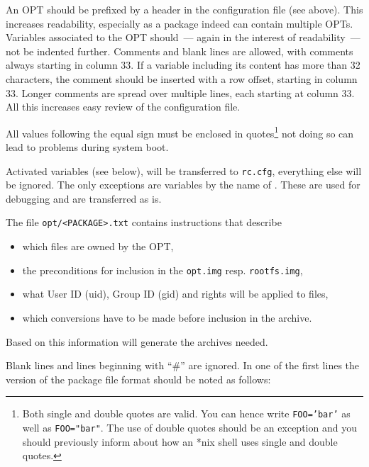 An OPT should be prefixed by a header in the configuration file (see
above). This increases readability, especially as a package indeed can
contain multiple OPTs. Variables associated to the OPT should~--- again
in the interest of readability~--- not be indented further. Comments and
blank lines are allowed, with comments always starting in column 33.
If a variable including its content has more than 32 characters, the
comment should be inserted with a row offset, starting in column 33.
Longer comments are spread over multiple lines, each starting at column
33. All this increases easy review of the configuration file.

All values following the equal sign must be enclosed in quotes\footnote{Both
single and double quotes are valid. You can hence write
\texttt{FOO='bar'} as well as \texttt{FOO="bar"}. The use of double quotes should be an
exception and you should previously inform about how an *nix shell uses single and
double quotes.}
not doing so can lead to problems during system boot.

    Activated variables (see below), will be transferred to \texttt{rc.cfg},
    everything else will be ignored. The only exceptions are variables by
    the name of . These are used for debugging and
    are transferred as is.


    The file \texttt{opt/<PACKAGE>.txt} contains instructions that describe
\begin{itemize}
\item which files are owned by the OPT,
\item the preconditions for inclusion in the \texttt{opt.img} resp. \texttt{rootfs.img},
\item what User ID (uid), Group ID (gid) and rights will be applied to files,
\item which conversions have to be made before inclusion in the archive.
\end{itemize}

Based on this information  will generate the archives needed.

Blank lines and lines beginning with ``\#'' are ignored. In one of the first lines
the version of the package file format should be noted as follows:

